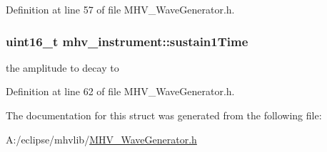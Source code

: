 \-Definition at line 57 of file \-M\-H\-V\-\_\-\-Wave\-Generator.\-h.

\hypertarget{structmhv__instrument_aff146a5abc59a0654d31089fe23d623e}{
\subsubsection[{sustain1\-Time}]{\setlength{\rightskip}{0pt plus 5cm}uint16\-\_\-t {\bf mhv\-\_\-instrument\-::sustain1\-Time}}}
\label{structmhv__instrument_aff146a5abc59a0654d31089fe23d623e}
the amplitude to decay to 

\-Definition at line 62 of file \-M\-H\-V\-\_\-\-Wave\-Generator.\-h.



\-The documentation for this struct was generated from the following file\-:\begin{DoxyCompactItemize}
\item 
\-A\-:/eclipse/mhvlib/\hyperlink{_m_h_v___wave_generator_8h}{\-M\-H\-V\-\_\-\-Wave\-Generator.\-h}\end{DoxyCompactItemize}
